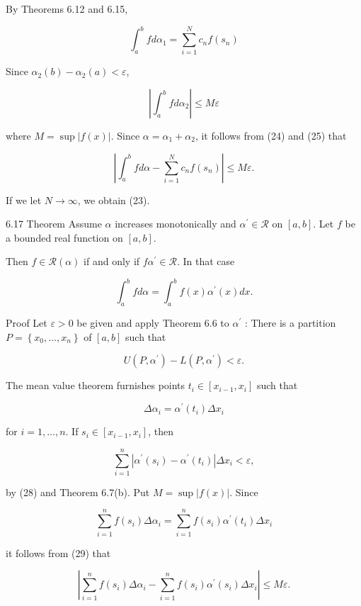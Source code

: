 \documentclass[10pt]{article}
\begin{document}
By Theorems 6.12 and 6.15,

$$
\int_{a}^{b} f d \alpha_{1}=\sum_{i=1}^{N} c_{n} f\left(s_{n}\right)
$$

Since $\alpha_{2}(b)-\alpha_{2}(a)<\varepsilon$,

$$
\left|\int_{a}^{b} f d \alpha_{2}\right| \leq M \varepsilon
$$

where $M=\sup |f(x)|$. Since $\alpha=\alpha_{1}+\alpha_{2}$, it follows from (24) and (25) that

$$
\left|\int_{a}^{b} f d \alpha-\sum_{i=1}^{N} c_{n} f\left(s_{n}\right)\right| \leq M \varepsilon .
$$

If we let $N \rightarrow \infty$, we obtain (23).

6.17 Theorem Assume $\alpha$ increases monotonically and $\alpha^{\prime} \in \mathscr{R}$ on $[a, b]$. Let $f$ be a bounded real function on $[a, b]$.

Then $f \in \mathscr{R}(\alpha)$ if and only if $f \alpha^{\prime} \in \mathscr{R}$. In that case

$$
\int_{a}^{b} f d \alpha=\int_{a}^{b} f(x) \alpha^{\prime}(x) d x .
$$

Proof Let $\varepsilon>0$ be given and apply Theorem 6.6 to $\alpha^{\prime}$ : There is a partition $P=\left\{x_{0}, \ldots, x_{n}\right\}$ of $[a, b]$ such that

$$
U\left(P, \alpha^{\prime}\right)-L\left(P, \alpha^{\prime}\right)<\varepsilon .
$$

The mean value theorem furnishes points $t_{i} \in\left[x_{i-1}, x_{i}\right]$ such that

$$
\Delta \alpha_{i}=\alpha^{\prime}\left(t_{i}\right) \Delta x_{i}
$$

for $i=1, \ldots, n$. If $s_{i} \in\left[x_{i-1}, x_{i}\right]$, then

$$
\sum_{i=1}^{n}\left|\alpha^{\prime}\left(s_{i}\right)-\alpha^{\prime}\left(t_{i}\right)\right| \Delta x_{i}<\varepsilon,
$$

by (28) and Theorem 6.7(b). Put $M=\sup |f(x)|$. Since

$$
\sum_{i=1}^{n} f\left(s_{i}\right) \Delta \alpha_{i}=\sum_{i=1}^{n} f\left(s_{i}\right) \alpha^{\prime}\left(t_{i}\right) \Delta x_{i}
$$

it follows from (29) that

$$
\left|\sum_{i=1}^{n} f\left(s_{i}\right) \Delta \alpha_{i}-\sum_{i=1}^{n} f\left(s_{i}\right) \alpha^{\prime}\left(s_{i}\right) \Delta x_{i}\right| \leq M \varepsilon .
$$
\end{document}
